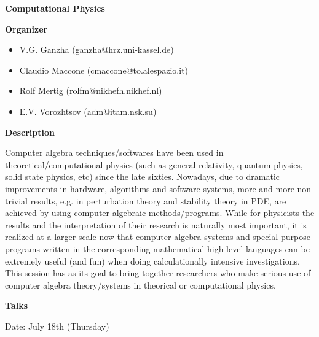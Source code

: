 \begin{center}
{\LARGE \bf Computational Physics
}
\end{center}
\bigskip

{\bf Organizer}

\begin{itemize}

\item
V.G. Ganzha (ganzha@hrz.uni-kassel.de)

\item
Claudio Maccone (cmaccone@to.alespazio.it)

\item
Rolf Mertig (rolfm@nikhefh.nikhef.nl) 

\item
E.V. Vorozhtsov (adm@itam.nsk.su)

\end{itemize}

\medskip

\bigskip

{\bf Description}
\medskip

Computer algebra techniques/softwares have been used in theoretical/computational physics (such
as general relativity, quantum physics, solid state physics, etc) since the late sixties. Nowadays, due
to dramatic improvements in hardware, algorithms and software systems, more and more
non-trivial results, e.g. in perturbation theory and stability theory in PDE, are achieved by using
computer algebraic methods/programs. While for physicists the results and the interpretation of
their research is naturally most important, it is realized at a larger scale now that computer algebra
systems and special-purpose programs written in the corresponding mathematical high-level
languages can be extremely useful (and fun) when doing calculationally intensive investigations.
This session has as its goal to bring together researchers who make serious use of computer algebra
theory/systems in theorical or computational physics. 

\bigskip
{\bf Talks}
\medskip

Date: July 18th (Thursday) 


